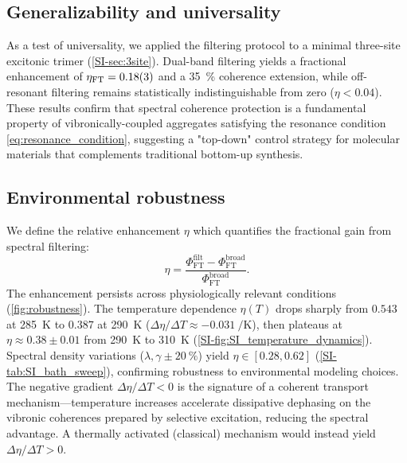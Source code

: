 \documentclass[journal=jpcl,manuscript=letter]{achemso}
\begin{document}
\subsection*{Generalizability and universality}

As a test of universality, we applied the filtering protocol to a minimal three-site excitonic trimer (\cref{SI-sec:3site}). Dual-band filtering yields a fractional enhancement of $\eta_{\mathrm{FT}} = \num{0.18 \pm 0.03}$ and a \SI{35}{\percent} coherence extension, while off-resonant filtering remains statistically indistinguishable from zero ($\eta < \num{0.04}$). These results confirm that spectral coherence protection is a fundamental property of vibronically-coupled aggregates satisfying the resonance condition \cref{eq:resonance_condition}, suggesting a "top-down" control strategy for molecular materials that complements traditional bottom-up synthesis.

\subsection*{Environmental robustness}

We define the relative enhancement $\eta$ which quantifies the fractional gain from spectral filtering:
\begin{equation}
\eta = \frac{\Phi_{\mathrm{FT}}^{\mathrm{filt}} - \Phi_{\mathrm{FT}}^{\mathrm{broad}}}{\Phi_{\mathrm{FT}}^{\mathrm{broad}}}.
\label{eq:eta_def}
\end{equation}
The enhancement persists across physiologically relevant conditions (\cref{fig:robustness}). The temperature dependence $\eta(T)$ drops sharply from $\num{0.543}$ at \SI{285}{\kelvin} to $\num{0.387}$ at \SI{290}{\kelvin} ($\Delta\eta/\Delta T \approx \SI{-0.031}{\per\kelvin}$), then plateaus at $\eta \approx \num{0.38}\pm\num{0.01}$ from \SI{290}{\kelvin} to \SI{310}{\kelvin} (\cref{SI-fig:SI_temperature_dynamics}). Spectral density variations ($\lambda, \gamma \pm \SI{20}{\percent}$) yield $\eta \in [\num{0.28}, \num{0.62}]$ (\cref{SI-tab:SI_bath_sweep}), confirming robustness to environmental modeling choices. The negative gradient $\Delta\eta/\Delta T < 0$ is the signature of a coherent transport mechanism---temperature increases accelerate dissipative dephasing on the vibronic coherences prepared by selective excitation, reducing the spectral advantage. A thermally activated (classical) mechanism would instead yield $\Delta\eta/\Delta T > 0$.
\end{document}
